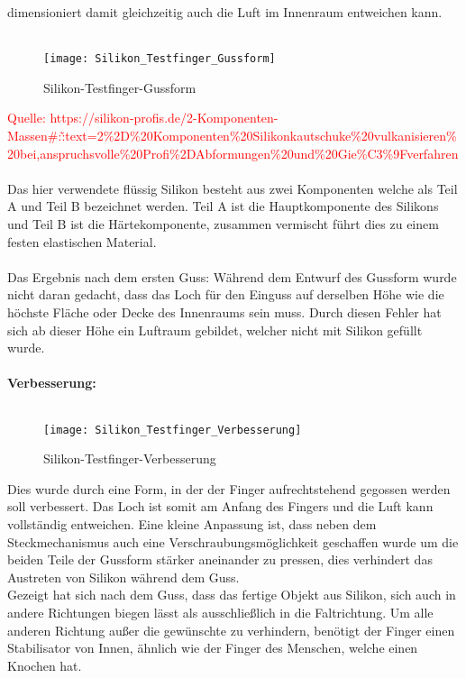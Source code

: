 \documentclass[titlepage,12pt,twoside]{article}
\begin{document}
dimensioniert damit gleichzeitig auch die Luft im Innenraum entweichen kann. \\
\\
\begin{figure}[H]
	\begin{center}
		\scalebox{1.2}
		{\texttt{[image: Silikon\_Testfinger\_Gussform]}}
		\caption{Silikon-Testfinger-Gussform}
		\label{fig:Silikon_Testfinger_Gussform}			
	\end{center}
\end{figure}
\hfill \break
\textcolor{red}{Quelle: https://silikon-profis.de/2-Komponenten-Massen\#:\~:text=2\%2D\%20Komponenten\%20Silikonkautschuke\%20vulkanisieren\%20bei,anspruchsvolle\%20Profi\%2DAbformungen\%20und\%20Gie\%C3\%9Fverfahren} \\
\\
Das hier verwendete flüssig Silikon besteht aus zwei Komponenten welche als Teil A und Teil B bezeichnet werden. Teil A ist die Hauptkomponente des Silikons und Teil B ist die Härtekomponente, zusammen vermischt führt dies zu einem festen elastischen 
Material. \\
\\
Das Ergebnis nach dem ersten Guss: Während dem Entwurf des Gussform wurde nicht daran gedacht, dass das Loch für den Einguss auf derselben Höhe wie die höchste Fläche oder Decke des Innenraums sein muss. Durch diesen Fehler hat sich ab dieser Höhe 
ein Luftraum gebildet, welcher nicht mit Silikon gefüllt wurde. \\
\\
\textbf{Verbesserung:} \\
\\
\begin{figure}[H]
	\begin{center}
		\scalebox{1.2}
		{\texttt{[image: Silikon\_Testfinger\_Verbesserung]}}
		\caption{Silikon-Testfinger-Verbesserung}
		\label{fig:Silikon_Testfinger_Verbesserung}			
	\end{center}
\end{figure}
\hfill \break
Dies wurde durch eine Form, in der der Finger aufrechtstehend gegossen werden soll verbessert. Das Loch ist somit am Anfang des Fingers und die Luft kann vollständig entweichen. Eine kleine Anpassung ist, dass neben dem Steckmechanismus auch eine 
Verschraubungsmöglichkeit geschaffen wurde um die beiden Teile der Gussform stärker aneinander zu pressen, dies verhindert das Austreten von Silikon während dem Guss. \\
Gezeigt hat sich nach dem Guss, dass das fertige Objekt aus Silikon, sich auch in andere Richtungen biegen lässt als ausschließlich in die Faltrichtung. Um alle anderen Richtung außer die gewünschte zu verhindern, benötigt der Finger einen 
Stabilisator von Innen, ähnlich wie der Finger des Menschen, welche einen Knochen hat. \\
\\
\end{document}
